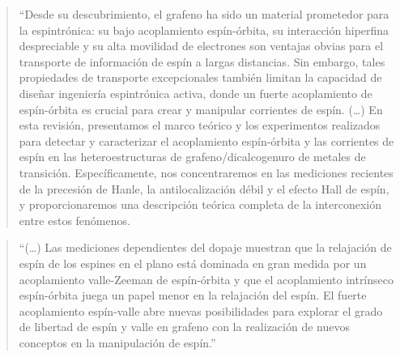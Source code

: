 \blockquote[]{``Desde su descubrimiento, el grafeno ha sido un 
	material prometedor para la espintrónica: su bajo acoplamiento espín-órbita, su 
	interacción hiperfina despreciable y su alta movilidad de electrones son 
	ventajas obvias para el transporte de información de espín a largas distancias. 
	Sin embargo, tales propiedades de transporte excepcionales también limitan la 
	capacidad de diseñar ingeniería espintrónica activa, donde un fuerte 
	acoplamiento de espín-órbita es crucial para crear y manipular corrientes de 
	espín.
	(\dots) En esta revisión, presentamos el marco teórico y los experimentos 
	realizados para detectar y caracterizar el acoplamiento espín-órbita y las 
	corrientes de espín en las heteroestructuras de grafeno/dicalcogenuro de metales 
	de transición. Específicamente, nos concentraremos en las mediciones recientes 
	de la precesión de Hanle, la antilocalización débil y el efecto Hall de espín, y 
	proporcionaremos una descripción teórica completa de la interconexión entre 
	estos fenómenos.}
	

\blockquote[]{``(\dots) Las mediciones dependientes del 
	dopaje muestran que la relajación de espín de los espines en el plano está 
	dominada en gran medida por un acoplamiento valle-Zeeman de espín-órbita y que 
	el acoplamiento intrínseco espín-órbita juega un papel menor en la relajación 
	del espín. El fuerte acoplamiento espín-valle abre nuevas posibilidades para 
	explorar el grado de libertad de espín y valle en grafeno con la realización de 
	nuevos conceptos en la manipulación de espín.''}

